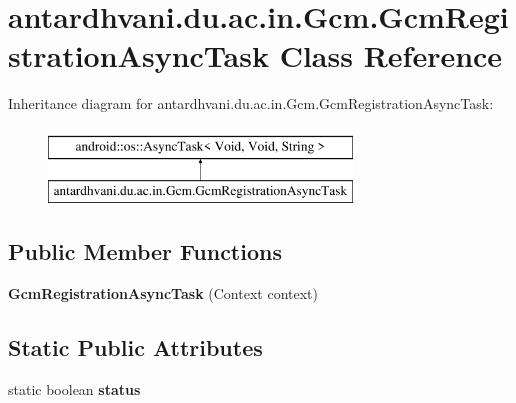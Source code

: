 \hypertarget{classantardhvani_1_1du_1_1ac_1_1in_1_1_gcm_1_1_gcm_registration_async_task}{}\section{antardhvani.\+du.\+ac.\+in.\+Gcm.\+Gcm\+Registration\+Async\+Task Class Reference}
\label{classantardhvani_1_1du_1_1ac_1_1in_1_1_gcm_1_1_gcm_registration_async_task}
Inheritance diagram for antardhvani.\+du.\+ac.\+in.\+Gcm.\+Gcm\+Registration\+Async\+Task\+:\begin{figure}[H]
\begin{center}
\leavevmode
\includegraphics[height=2.000000cm]{classantardhvani_1_1du_1_1ac_1_1in_1_1_gcm_1_1_gcm_registration_async_task}
\end{center}
\end{figure}
\subsection*{Public Member Functions}
\begin{DoxyCompactItemize}
\item 
\hypertarget{classantardhvani_1_1du_1_1ac_1_1in_1_1_gcm_1_1_gcm_registration_async_task_a06b35ddc560d85c16d68a99bb8600bc2}{}{\bfseries Gcm\+Registration\+Async\+Task} (Context context)\label{classantardhvani_1_1du_1_1ac_1_1in_1_1_gcm_1_1_gcm_registration_async_task_a06b35ddc560d85c16d68a99bb8600bc2}

\end{DoxyCompactItemize}
\subsection*{Static Public Attributes}
\begin{DoxyCompactItemize}
\item 
\hypertarget{classantardhvani_1_1du_1_1ac_1_1in_1_1_gcm_1_1_gcm_registration_async_task_a7e1f7d9819e3d3d84726eb35bc853650}{}static boolean {\bfseries status}\label{classantardhvani_1_1du_1_1ac_1_1in_1_1_gcm_1_1_gcm_registration_async_task_a7e1f7d9819e3d3d84726eb35bc853650}

\end{DoxyCompactItemize}
